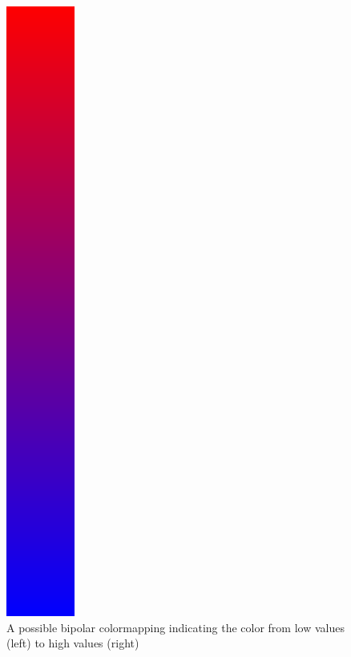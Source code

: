 \begin{description}
\begin{figure}[htb]
				\includegraphics[angle=270, width=\linewidth, totalheight=1em, frame]{./content/pictures/bipolar.png}
				\caption{A possible bipolar colormapping indicating the color from low values (left) to high values (right)}
			\end{figure}


\end{description}
